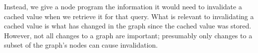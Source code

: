 \documentclass[letterpaper,twocolumn,11pt,tight]{article}
\begin{document}

Instead, we give a node program the information it would need to invalidate a cached value when we retrieve it for that query.
What is relevant to invalidating a cached value is what has changed in the graph since the cached value was stored.
However, not all changes to a graph are important; presumably only changes to a subset of the graph's nodes can cause invalidation.
\end{document}
